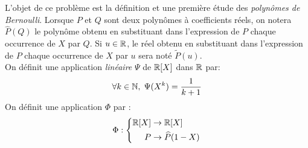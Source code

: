 L'objet de ce problème est la définition et une première étude des \emph{polynômes de Bernoulli}.\newline
Lorsque $P$ et $Q$ sont deux polynômes à coefficients réels, on notera $\widehat{P}(Q)$ le polynôme obtenu en substituant dans l'expression de $P$ chaque occurrence de $X$ par $Q$. Si $u\in \mathbb{R}$, le réel obtenu en substituant dans l'expression de $P$ chaque occurrence de $X$ par $u$ sera noté $\widetilde{P}(u)$.\\
On définit une application \emph{linéaire} $\Psi$ de $\mathbb{R}[X]$ dans $\mathbb{R}$ par:
\begin{displaymath}
 \forall k\in \mathbb{N},\; \Psi(X^k)=\frac{1}{k+1}
\end{displaymath}
On définit une application $\Phi$ par :
\begin{displaymath}
 \Phi :
\left\lbrace 
\begin{aligned}
 \mathbb{R}[X] &\rightarrow \mathbb{R}[X]\\
 P &\rightarrow \widehat{P}(1-X)
\end{aligned}
\right. 
\end{displaymath}
